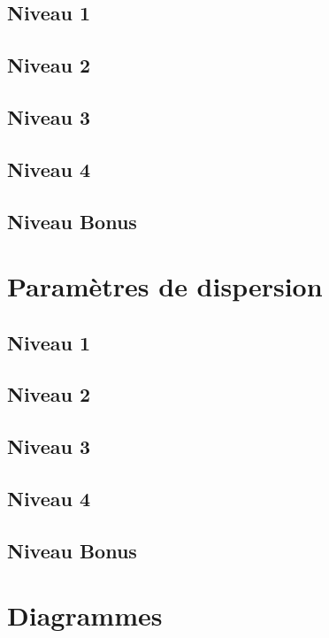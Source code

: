 \documentclass[a4paper]{report}
\begin{document}
			\subsection{Niveau 1}
		
			\subsection{Niveau 2}
		
			\subsection{Niveau 3}
			
			\subsection{Niveau 4}
			
			\subsection{Niveau Bonus}
		
		\section{Paramètres de dispersion}
		
			\subsection{Niveau 1}
		
			\subsection{Niveau 2}
		
			\subsection{Niveau 3}
			
			\subsection{Niveau 4}
			
			\subsection{Niveau Bonus}
		
		\section{Diagrammes}
		
\end{document}
